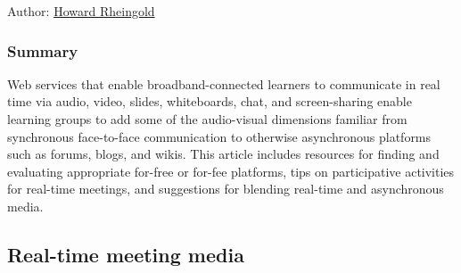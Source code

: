 Author: \href{http://peeragogy.org/resources/meet-the-team/}{Howard
Rheingold}

\subsubsection{Summary}

Web services that enable broadband-connected learners to communicate in
real time via audio, video, slides, whiteboards, chat, and
screen-sharing enable learning groups to add some of the audio-visual
dimensions familiar from synchronous face-to-face communication to
otherwise asynchronous platforms such as forums, blogs, and wikis. This
article includes resources for finding and evaluating appropriate
for-free or for-fee platforms, tips on participative activities for
real-time meetings, and suggestions for blending real-time and
asynchronous media.

\subsection{Real-time meeting media}

